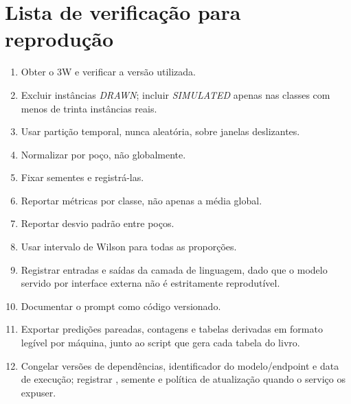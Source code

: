 \section{Lista de verificação para reprodução}

\begin{enumerate}[leftmargin=*,itemsep=0.25em]
  \item Obter o 3W e verificar a versão utilizada.
  \item Excluir instâncias \emph{DRAWN}; incluir \emph{SIMULATED} apenas nas classes com
        menos de trinta instâncias reais.
  \item Usar partição temporal, nunca aleatória, sobre janelas deslizantes.
  \item Normalizar por poço, não globalmente.
  \item Fixar sementes e registrá-las.
  \item Reportar métricas por classe, não apenas a média global.
  \item Reportar desvio padrão entre poços.
  \item Usar intervalo de Wilson para todas as proporções.
  \item Registrar entradas e saídas da camada de linguagem, dado que o modelo servido por
        interface externa não é estritamente reprodutível.
  \item Documentar o prompt como código versionado.
  \item Exportar predições pareadas, contagens e tabelas derivadas em formato legível por
        máquina, junto ao script que gera cada tabela do livro.
  \item Congelar versões de dependências, identificador do modelo/endpoint e data de
        execução; registrar , semente e política de atualização quando o
        serviço os expuser.
\end{enumerate}
